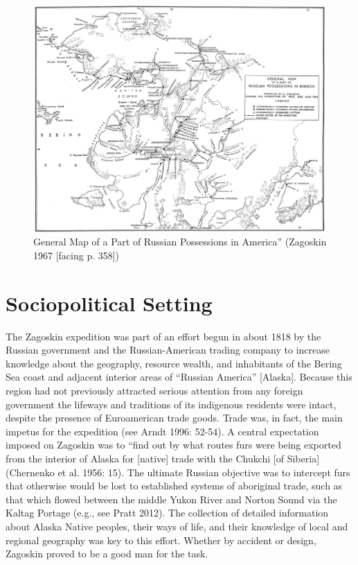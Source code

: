 \begin{figure}
    \centering
    \includegraphics[scale=0.5]{figures/pratt-fig2}
    \caption{General Map of a Part of Russian Possessions in America” (Zagoskin 1967 [facing p. 358])}
    \label{fig2}
\end{figure}

\section*{Sociopolitical Setting}
The Zagoskin expedition was part of an effort begun in about 1818 by the Russian government and the Russian-American trading company to increase knowledge about the geography, resource wealth, and inhabitants of the Bering Sea coast and adjacent interior areas of “Russian America” [Alaska]. Because this region had not previously attracted serious attention from any foreign government the lifeways and traditions of its indigenous residents were intact, despite the presence of Euroamerican trade goods. Trade was, in fact, the main impetus for the expedition (see Arndt 1996: 52-54). A central expectation imposed on Zagoskin was to “find out by what routes furs were being exported from the interior of Alaska for [native] trade with the Chukchi [of Siberia] (Chernenko et al. 1956: 15). The ultimate Russian objective was to intercept furs that otherwise would be lost to established systems of aboriginal trade, such as that which flowed between the middle Yukon River and Norton Sound via the Kaltag Portage (e.g., see Pratt 2012). The collection of detailed information about Alaska Native peoples, their ways of life, and their knowledge of local and regional geography was key to this effort. Whether by accident or design, Zagoskin proved to be a good man for the task.


